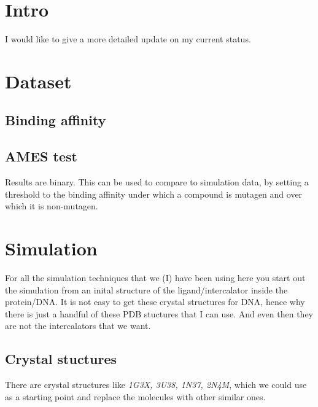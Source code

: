 \documentclass{article}
\begin{document}
\section{Intro}

I would like to give a more detailed update on my current status.

\section{Dataset}

\subsection{Binding affinity}




\subsection{AMES test}

Results are binary. This can be used to compare to simulation data, by setting a threshold to the binding affinity under which a compound is mutagen and over which it is non-mutagen.


\section{Simulation}

For all the simulation techniques that we (I) have been using here you start out the simulation from an inital structure of the ligand/intercalator inside the protein/DNA. It is not easy to get these crystal structures for DNA, hence why there is just a handful of these PDB stuctures that I can use. And even then they are not the intercalators that we want.

\subsection{Crystal stuctures}

There are crystal structures like \emph{1G3X, 3U38, 1N37, 2N4M}, which we could use as a starting point and replace the molecules with other similar ones.
\end{document}
